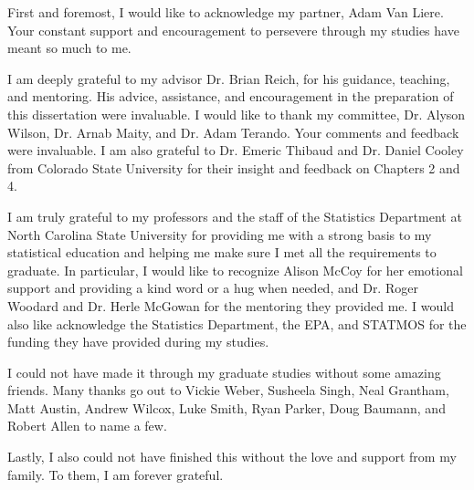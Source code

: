 \begin{acknowledgements}
First and foremost, I would like to acknowledge my partner, Adam Van Liere.
Your constant support and encouragement to persevere through my studies have meant so much to me.

I am deeply grateful to my advisor Dr. Brian Reich, for his guidance, teaching, and mentoring. 
His advice, assistance, and encouragement in the preparation of this dissertation were invaluable.
I would like to thank my committee, Dr. Alyson Wilson, Dr. Arnab Maity, and Dr. Adam Terando.
Your comments and feedback were invaluable. 
I am also grateful to Dr. Emeric Thibaud and Dr. Daniel Cooley from Colorado State University for their insight and feedback on Chapters 2 and 4.

I am truly grateful to my professors and the staff of the Statistics Department at North Carolina State University for providing me with a strong basis to my statistical education and helping me make sure I met all the requirements to graduate.
In particular, I would like to recognize Alison McCoy for her emotional support and providing a kind word or a hug when needed, and Dr. Roger Woodard and Dr. Herle McGowan for the mentoring they provided me. 
I would also like acknowledge the Statistics Department, the EPA, and STATMOS for the funding they have provided during my studies.

I could not have made it through my graduate studies without some amazing friends.
Many thanks go out to Vickie Weber, Susheela Singh, Neal Grantham, Matt Austin, Andrew Wilcox, Luke Smith, Ryan Parker, Doug Baumann, and Robert Allen to name a few.

Lastly, I also could not have finished this without the love and support from my family.
To them, I am forever grateful.

\end{acknowledgements}


\thesistableofcontents

\thesislistoftables

\thesislistoffigures
